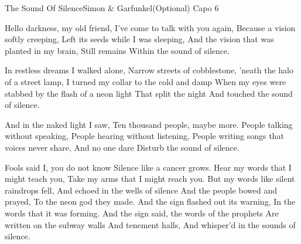 \begin{song}{The Sound Of Silence}{Simon \& Garfunkel}{(Optional) Capo 6}

Hello darkness, my old friend, I've come to talk with you again,
Because a vision softly creeping, Left its seeds while I was sleeping,
And the vision that was planted in my brain, Still remains
Within the sound of silence.

In restless dreams I walked alone, Narrow streets of cobblestone,
'neath the halo of a street lamp, I turned my collar to the cold and damp
When my eyes were stabbed by the flash of a neon light
That split the night
And touched the sound of silence.

And in the naked light I saw, Ten thousand people, maybe more.
People talking without speaking, People hearing without listening,
People writing songs that voices never share, And no one dare
Disturb the sound of silence.

Fools said I, you do not know
Silence like a cancer grows. Hear my words that I might teach you,
Take my arms that I might reach you.
But my words like silent raindrops fell,
And echoed in the wells of silence
\newpage
{}
And the people bowed and prayed, To the neon god they made.
And the sign flashed out its warning, In the words that it was forming.
And the sign said, the words of the prophets
Are written on the subway walls
And tenement halls, And whisper'd in the sounds of silence.
\end{song}
